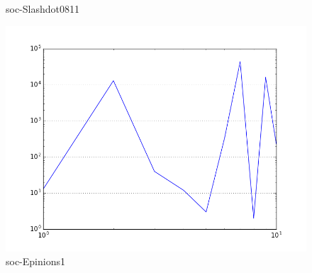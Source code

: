 \begin{figure}[H]
  \caption*{soc-Slashdot0811}
\endminipage\hfill
{}
  \includegraphics[width=\linewidth]{img/soc-E/radius_dist.png}
  \caption*{soc-Epinions1}
\endminipage
\end{figure}
